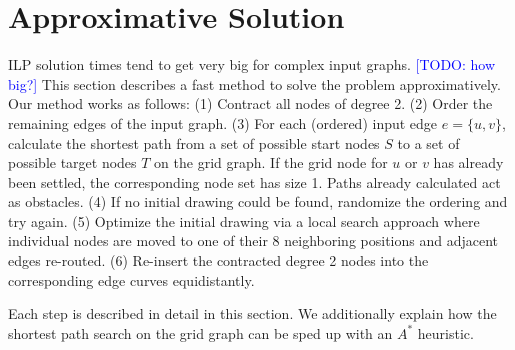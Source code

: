 \documentclass[sigconf]{acmart}
\newcommand\TODO[1]{\textcolor{blue}{\small [TODO: #1]}}
\begin{document}
\section{Approximative Solution}

ILP solution times tend to get very big for complex input graphs. \TODO{how big?}
This section describes a fast method to solve the problem approximatively.
Our method works as follows:
  (1) Contract all nodes of degree 2.
  (2) Order the remaining edges of the input graph.
  (3) For each (ordered) input edge $e = \{u, v\}$, calculate the shortest path from a set of possible start nodes $S$ to a set of possible target nodes $T$ on the grid graph. If the grid node for $u$ or $v$ has already been settled, the corresponding node set has size 1. Paths already calculated act as obstacles.
  (4) If no initial drawing could be found, randomize the ordering and try again.
  (5) Optimize the initial drawing via a local search approach where individual nodes are moved to one of their 8 neighboring positions and adjacent edges re-routed.
  (6) Re-insert the contracted degree 2 nodes into the corresponding edge curves equidistantly.

Each step is described in detail in this section.
We additionally explain how the shortest path search on the grid graph can be sped up with an $A^*$ heuristic.
\end{document}
